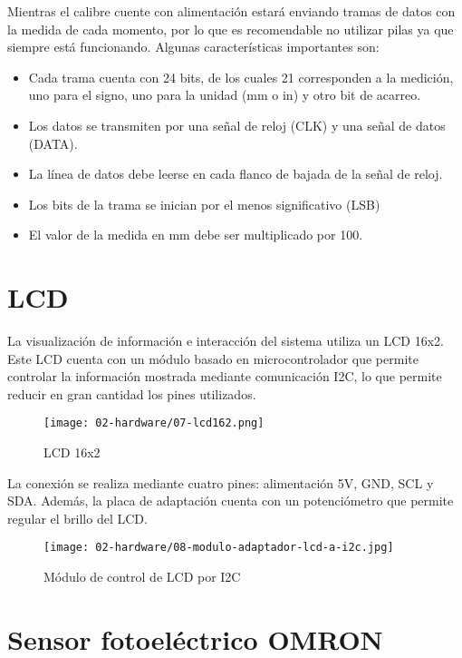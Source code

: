 Mientras el calibre cuente con alimentación estará enviando tramas de
datos con la medida de cada momento, por lo que es recomendable no 
utilizar pilas ya que siempre está funcionando. Algunas características 
importantes son:

\begin{itemize}
    \item Cada trama cuenta con 24 bits, de los cuales 21 corresponden
    a la medición, uno para el signo, uno para la unidad (mm o in) y otro
    bit de acarreo.
    \item Los datos se transmiten por una señal de reloj (CLK) y una señal
    de datos (DATA).
    \item La línea de datos debe leerse en cada flanco de bajada de 
    la señal de reloj.
    \item Los bits de la trama se inician por el menos significativo (LSB)
    \item El valor de la medida en mm debe ser multiplicado por 100.
\end{itemize}

\section{LCD}

La visualización de información e interacción del sistema utiliza un LCD 16x2. 
Este LCD cuenta con un módulo basado en microcontrolador que permite controlar 
la información mostrada mediante comunicación I2C, lo que permite reducir en 
gran cantidad los pines utilizados. 

\begin{figure}[hbtp]
	\centering
	\texttt{[image: 02-hardware/07-lcd162.png]}
	\caption{LCD 16x2}
	\label{fig:figura27}
	\end{figure}

La conexión se realiza mediante cuatro pines: alimentación 5V, GND, SCL y SDA.
Además, la placa de adaptación cuenta con un potenciómetro que permite regular
el brillo del LCD.

\begin{figure}[hbtp]
    \centering
    \texttt{[image: 02-hardware/08-modulo-adaptador-lcd-a-i2c.jpg]}
    \caption{Módulo de control de LCD por I2C}
    \label{fig:figura28}
    \end{figure}

\section{Sensor fotoeléctrico OMRON}


